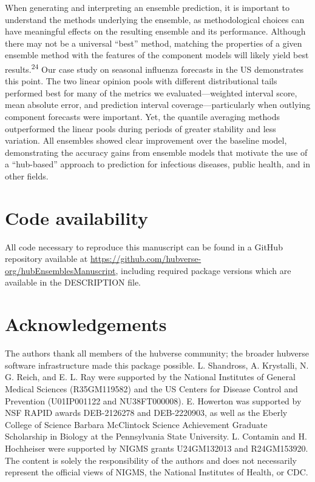 \documentclass[
]{article}
\begin{document}
When generating and interpreting an ensemble prediction, it is important
to understand the methods underlying the ensemble, as methodological
choices can have meaningful effects on the resulting ensemble and its
performance. Although there may not be a universal ``best'' method,
matching the properties of a given ensemble method with the features of
the component models will likely yield best results.\textsuperscript{24}
Our case study on seasonal influenza forecasts in the US demonstrates
this point. The two linear opinion pools with different distributional
tails performed best for many of the metrics we evaluated---weighted
interval score, mean absolute error, and prediction interval
coverage---particularly when outlying component forecasts were
important. Yet, the quantile averaging methods outperformed the linear
pools during periods of greater stability and less variation. All
ensembles showed clear improvement over the baseline model,
demonstrating the accuracy gains from ensemble models that motivate the
use of a ``hub-based'' approach to prediction for infectious diseases,
public health, and in other fields.

\section*{Code availability}\label{code-availability}

All code necessary to reproduce this manuscript can be found in a GitHub
repository available at
\url{https://github.com/hubverse-org/hubEnsemblesManuscript}, including
required package versions which are available in the DESCRIPTION file.

\section*{Acknowledgements}\label{acknowledgements}

The authors thank all members of the hubverse community; the broader
hubverse software infrastructure made this package possible. L.
Shandross, A. Krystalli, N. G. Reich, and E. L. Ray were supported by
the National Institutes of General Medical Sciences (R35GM119582) and
the US Centers for Disease Control and Prevention (U01IP001122 and
NU38FT000008). E. Howerton was supported by NSF RAPID awards DEB-2126278
and DEB-2220903, as well as the Eberly College of Science Barbara
McClintock Science Achievement Graduate Scholarship in Biology at the
Pennsylvania State University. L. Contamin and H. Hochheiser were
supported by NIGMS grants U24GM132013 and R24GM153920. The content is
solely the responsibility of the authors and does not necessarily
represent the official views of NIGMS, the National Institutes of
Health, or CDC.
\end{document}
